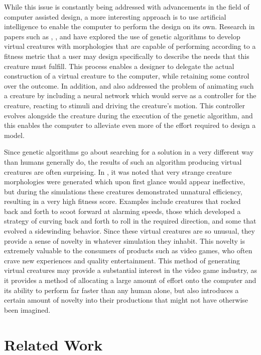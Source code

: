 \documentclass[12pt]{article}
\begin{document}
While this issue is constantly being addressed with advancements in the field of computer assisted design, a more interesting approach is to use artificial intelligence to enable the computer to perform the design on its own.
Research in papers such as \cite{sims1994evolving}, \cite{lehman2011evolving}, and \cite{hornby2001evolving} have explored the use of genetic algorithms to develop virtual creatures with morphologies that are capable of performing according to a fitness metric that a user may design specifically to describe the needs that this creature must fulfill.
This process enables a designer to delegate the actual construction of a virtual creature to the computer, while retaining some control over the outcome. 
In addition, \cite{sims1994evolving} and \cite{lehman2011evolving} also addressed the problem of animating such a creature by including a neural network which would serve as a controller for the creature, reacting to stimuli and driving the creature’s motion.
This controller evolves alongside the creature during the execution of the genetic algorithm, and this enables the computer to alleviate even more of the effort required to design a model.

Since genetic algorithms go about searching for a solution in a very different way than humans generally do, the results of such an algorithm producing virtual creatures are often surprising.
In \cite{sims1994evolving}, it was noted that very strange creature morphologies were generated which upon first glance would appear ineffective, but during the simulations these creatures demonstrated unnatural efficiency, resulting in a very high fitness score.
Examples include creatures that rocked back and forth to scoot forward at alarming speeds, those which developed a strategy of curving back and forth to roll in the required direction, and some that evolved a sidewinding behavior.
Since these virtual creatures are so unusual, they provide a sense of novelty in whatever simulation they inhabit.
This novelty is extremely valuable to the consumers of products such as video games, who often crave new experiences and quality entertainment.
This method of generating virtual creatures may provide a substantial interest in the video game industry, as it provides a method of allocating a large amount of effort onto the computer and its ability to perform far faster than any human alone, but also introduces a certain amount of novelty into their productions that might not have otherwise been imagined.

\section*{Related Work}
\end{document}
